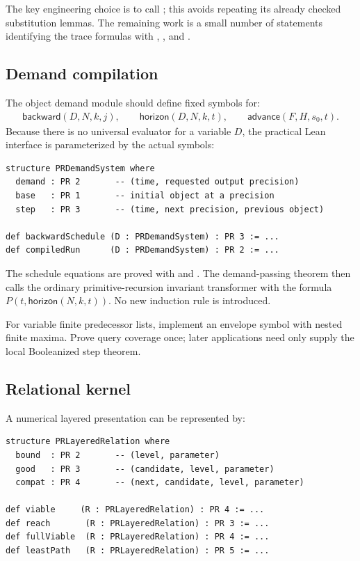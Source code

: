 The key engineering choice is to call ; this avoids
repeating its already checked substitution lemmas.  The remaining work is a
small number of  statements identifying the trace formulas with
, , and .

\subsection{Demand compilation}

The object demand module should define fixed symbols for:
\begin{align*}
 \mathsf{backward}(D,N,k,j),\qquad
 \mathsf{horizon}(D,N,k,t),\qquad
 \mathsf{advance}(F,H,s_0,t).
\end{align*}
Because there is no universal evaluator for a variable \(D\), the practical
Lean interface is parameterized by the actual  symbols:

\begin{lstlisting}
structure PRDemandSystem where
  demand : PR 2       -- (time, requested output precision)
  base   : PR 1       -- initial object at a precision
  step   : PR 3       -- (time, next precision, previous object)

def backwardSchedule (D : PRDemandSystem) : PR 3 := ...
def compiledRun      (D : PRDemandSystem) : PR 2 := ...
\end{lstlisting}

The schedule equations are proved with  and
.  The demand-passing theorem then calls the ordinary
primitive-recursion invariant transformer with the formula
\(P(t,\mathsf{horizon}(N,k,t))\).  No new induction rule is introduced.

For variable finite predecessor lists, implement an envelope symbol with nested
finite maxima.  Prove query coverage once; later applications need only supply
the local Booleanized step theorem.

\subsection{Relational kernel}

A numerical layered presentation can be represented by:

\begin{lstlisting}
structure PRLayeredRelation where
  bound  : PR 2       -- (level, parameter)
  good   : PR 3       -- (candidate, level, parameter)
  compat : PR 4       -- (next, candidate, level, parameter)

def viable     (R : PRLayeredRelation) : PR 4 := ...
def reach       (R : PRLayeredRelation) : PR 3 := ...
def fullViable  (R : PRLayeredRelation) : PR 4 := ...
def leastPath   (R : PRLayeredRelation) : PR 5 := ...
\end{lstlisting}

